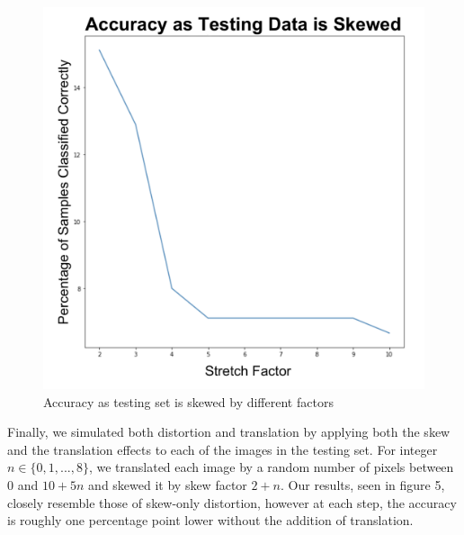 \documentclass{amsart}
\theoremstyle{definition}
\theoremstyle{remark}
\begin{document}
\begin{figure}
\caption{Accuracy as testing set is skewed by different factors}
\includegraphics[scale=0.25]{figures/Skew.png}
\end{figure}

Finally, we simulated both distortion and translation by applying both the skew and the translation effects to each of the images in the testing set. For integer $n\in\{0,1,...,8\}$, we translated each image by a random number of pixels between 0 and $10+5n$ and skewed it by skew factor $2+n$. Our results, seen in figure 5, closely resemble those of skew-only distortion, however at each step, the accuracy is roughly one percentage point lower without the addition of translation.
\end{document}

